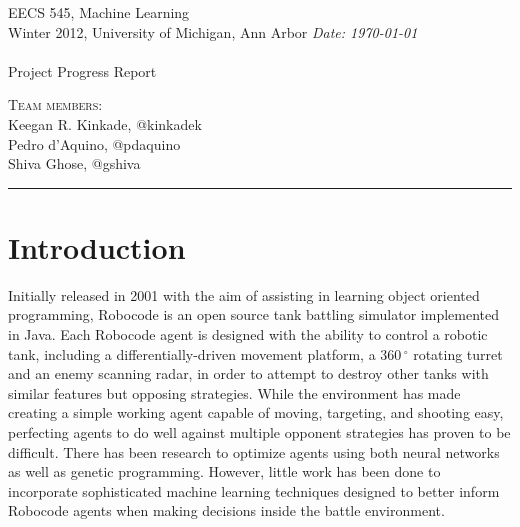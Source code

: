 \documentclass{article}
\newcommand{\shortbar}{\begin{center}\rule{5ex}{0.1pt}\end{center}}
\newcommand{\courseNumber}{EECS 545}
\newcommand{\courseTitle}{Machine Learning}
\newcommand{\semester}{Winter 2012}
\theoremstyle{plain}
\theoremstyle{definition}
\theoremstyle{remark}
\newenvironment{solution}[1]{\medskip\noindent{\bf Problem #1.~}}{\shortbar}
\newcommand{\solutions}[4]{
\vspace{-2ex}
\begin{center}
{\small  \courseNumber, \courseTitle
\hfill {\Large \bf {#1} }\\
\semester, University of Michigan, Ann Arbor \hfill
{\em Date: #3}}\\
\vspace{-1ex}
\hrulefill\\
\vspace{4ex}
{\normalsize Project Progress Report}\\
\vspace{2ex}
\end{center}
\begin{trivlist}
\item \textsc{Team members:} {#4}
\end{trivlist}
\noindent
\shortbar
\vspace{3ex}
}
\begin{document}
\solutions{}{}{\today}{\\ Keegan R. Kinkade, @kinkadek\\ Pedro d'Aquino, @pdaquino \\Shiva Ghose, @gshiva }
%
%

\begin{abstract}

In order for artificial intelligence agents to autonomously operate within a given environment, they must be capable of processing perceptual knowledge in such a manner as to maximize their performance measure \cite{russelnorvig}. For a competitively driven AI agent, this becomes increasingly important as the inability to intelligently process perceptual information will ultimately lead to defeat by those who are capable of such computation. To this end, the following describes the implementation of sophisticated machine learning techniques in an artificially driven tank battle simulator. Armed with such techniques, it is the goal of this project to provide a competitive, autonomous AI agent with the ability to determine how to best evade an opponent's attacks while striking in such a manner as to maximize the possibility of destroying the enemy. 

\end{abstract}

\section{Introduction}

Initially released in 2001 with the aim of assisting in learning object oriented programming, Robocode is an open source tank battling simulator implemented in Java. Each Robocode agent is designed with the ability to control a robotic tank, including a differentially-driven movement platform, a $360\,^{\circ}\mathrm{}$ rotating turret and an enemy scanning radar, in order to attempt to destroy other tanks with similar features but opposing strategies. While the environment has made creating a simple working agent capable of moving, targeting, and shooting easy, perfecting agents to do well against multiple opponent strategies has proven to be difficult. There has been research to optimize agents using both neural networks as well as genetic programming. However, little work has been done to incorporate sophisticated machine learning techniques designed to better inform Robocode agents when making decisions inside the battle environment.
\end{document}
